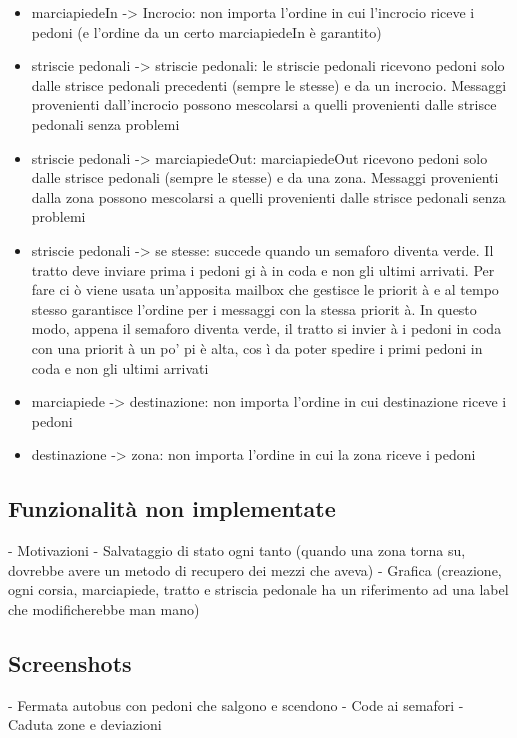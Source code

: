 \documentclass{article}
\begin{document}
\begin{itemize}
\item {marciapiedeIn -\textgreater{} Incrocio:} non importa l\textquoteright{}ordine in cui l\textquoteright{}incrocio riceve i pedoni (e l\textquoteright{}ordine da un certo marciapiedeIn  \`{e} garantito)
\item {striscie pedonali -\textgreater{} striscie pedonali:} le striscie pedonali ricevono pedoni solo dalle strisce pedonali precedenti (sempre le stesse) e da un incrocio. Messaggi provenienti dall\textquoteright{}incrocio possono mescolarsi a quelli provenienti dalle strisce pedonali senza problemi
\item {striscie pedonali -\textgreater{} marciapiedeOut:} marciapiedeOut ricevono pedoni solo dalle strisce pedonali (sempre le stesse) e da una zona. Messaggi provenienti dalla zona possono mescolarsi a quelli provenienti dalle strisce pedonali senza problemi
\item {striscie pedonali -\textgreater{} se stesse:} succede quando un semaforo diventa verde. Il tratto deve inviare prima i pedoni gi \`{a} in coda e non gli ultimi arrivati. Per fare ci \`{o} viene usata un\textquoteright{}apposita mailbox che gestisce le priorit \`{a} e al tempo stesso garantisce l\textquoteright{}ordine per i messaggi con la stessa priorit \`{a}. In questo modo, appena il semaforo diventa verde, il tratto si invier \`{a} i pedoni in coda con una priorit \`{a} un po\textquoteright{} pi \`{e} alta, cos \`{i} da poter spedire i primi pedoni in coda e non gli ultimi arrivati 
\item {marciapiede -\textgreater{} destinazione:} non importa l\textquoteright{}ordine in cui destinazione riceve i pedoni
\item {destinazione -\textgreater{} zona:} non importa l\textquoteright{}ordine in cui la zona riceve i pedoni
\end{itemize}
\subsection{Funzionalit\`{a} non implementate}
- Motivazioni \newline
- Salvataggio di stato ogni tanto (quando una zona torna su, dovrebbe avere un metodo di recupero dei mezzi che aveva) \newline
- Grafica (creazione, ogni corsia, marciapiede, tratto e striscia pedonale ha un riferimento ad una label che modificherebbe man mano) \newline
\subsection{Screenshots}
- Fermata autobus con pedoni che salgono e scendono \newline
- Code ai semafori \newline
- Caduta zone e deviazioni
\end{document}
